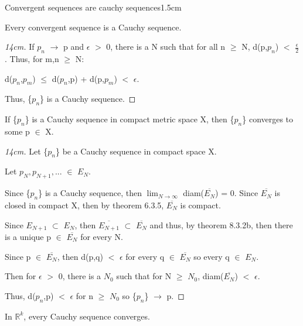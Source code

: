     \begin{ltheorem}{Convergent sequences are cauchy sequences}{1.5cm}
        \item Every convergent sequence is a Cauchy sequence.

            \begin{proof}[14cm]
                If $p_n$ $\rightarrow$ p and $\epsilon$ $>$ 0, there is a
                N such that for all n $\geq$ N, d(p,$p_n$) $<$ $\frac{\epsilon}{2}$.
                Thus, for m,n $\geq$ N:

				\hspace{0.5cm}
				d($p_n$,$p_m$) $\leq$ d($p_n$,p) + d(p,$p_m$) $<$ $\epsilon$.

				Thus, \{$p_n$\} is a Cauchy sequence.                
            \end{proof}

        \item If \{$p_n$\} is a Cauchy sequence in compact metric space X,
            then \{$p_n$\} converges to some p $\in$ X.

            \begin{proof}[14cm]
                Let \{$p_n$\} be a Cauchy sequence in compact space X.

				Let	$p_N, p_{N+1}, ... $ $\in$ $E_N$.

				Since \{$p_n$\} is a Cauchy sequence, then
				$\lim_{N \rightarrow \infty}$ diam($\overline{E_N}$) = 0.
				Since $\overline{E_N}$ is closed in compact X, then
				by {\color{red} theorem 6.3.5}, $\overline{E_N}$ is compact.

				Since $E_{N+1}$ $\subset$ $E_N$, then $\overline{E_{N+1}}$
				$\subset$ $\overline{E_N}$ and thus, by
                {\color{red} theorem 8.3.2b},
				then there is a unique p $\in$ $\overline{E_N}$ for every N.

				Since p $\in$ $\overline{E_N}$, then d(p,q) $<$ $\epsilon$ for
                every q $\in$ $\overline{E_N}$ so every q $\in$ $E_N$.

                Then for $\epsilon$ $>$ 0, there is a $N_0$ such that
                for N $\geq$ $N_0$, diam($\overline{E_N}$) $<$ $\epsilon$.

				Thus, d($p_n$,p) $<$ $\epsilon$ for n $\geq$ $N_0$ so
                \{$p_n$\} $\rightarrow$ p.
            \end{proof}

        \item In $\mathbb{R}^k$, every Cauchy sequence converges.
        

\end{ltheorem}
